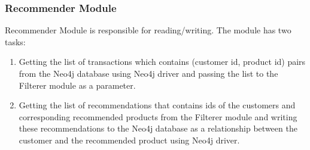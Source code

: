 \subsubsection{Recommender Module} Recommender Module is responsible for reading/writing. The module has two tasks:
\begin{enumerate}
	\item Getting the list of transactions which contains (customer id, product id) pairs from the Neo4j database using Neo4j driver and passing the list to the Filterer module as a parameter.
	\item Getting the list of recommendations that contains ids of the customers and corresponding recommended products from the Filterer module and writing these recommendations to the Neo4j database as a relationship between the customer and the recommended product using Neo4j driver.
\end{enumerate}